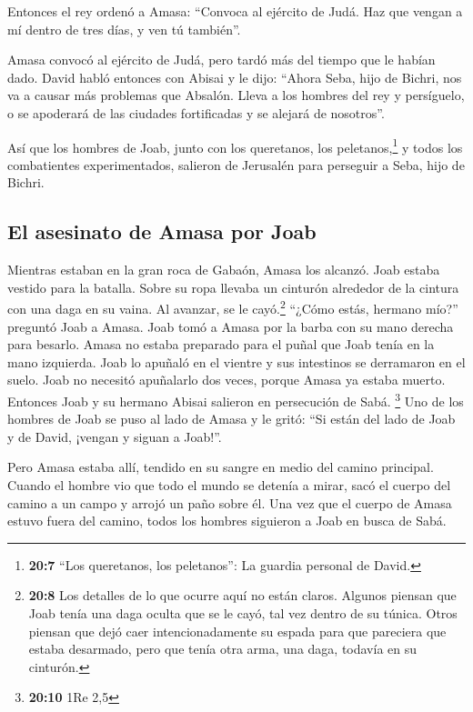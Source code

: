  Entonces el rey ordenó a Amasa: ``Convoca al ejército de
Judá. Haz que vengan a mí dentro de tres días, y ven tú también''.

 Amasa convocó al ejército de Judá, pero tardó más del
tiempo que le habían dado.  David habló entonces con
Abisai y le dijo: ``Ahora Seba, hijo de Bichri, nos va a causar más
problemas que Absalón. Lleva a los hombres del rey y persíguelo, o se
apoderará de las ciudades fortificadas y se alejará de nosotros''.

 Así que los hombres de Joab, junto con los queretanos,
los peletanos,\footnote{\textbf{20:7} ``Los queretanos, los peletanos'':
  La guardia personal de David.} y todos los combatientes
experimentados, salieron de Jerusalén para perseguir a Seba, hijo de
Bichri.

\hypertarget{el-asesinato-de-amasa-por-joab}{%
\subsection{El asesinato de Amasa por
Joab}\label{el-asesinato-de-amasa-por-joab}}

 Mientras estaban en la gran roca de Gabaón, Amasa los
alcanzó. Joab estaba vestido para la batalla. Sobre su ropa llevaba un
cinturón alrededor de la cintura con una daga en su vaina. Al avanzar,
se le cayó.\footnote{\textbf{20:8} Los detalles de lo que ocurre aquí no
  están claros. Algunos piensan que Joab tenía una daga oculta que se le
  cayó, tal vez dentro de su túnica. Otros piensan que dejó caer
  intencionadamente su espada para que pareciera que estaba desarmado,
  pero que tenía otra arma, una daga, todavía en su cinturón.}
 ``¿Cómo estás, hermano mío?'' preguntó Joab a Amasa. Joab
tomó a Amasa por la barba con su mano derecha para besarlo.
 Amasa no estaba preparado para el puñal que Joab tenía
en la mano izquierda. Joab lo apuñaló en el vientre y sus intestinos se
derramaron en el suelo. Joab no necesitó apuñalarlo dos veces, porque
Amasa ya estaba muerto. Entonces Joab y su hermano Abisai salieron en
persecución de Sabá. \footnote{\textbf{20:10} 1Re 2,5} 
Uno de los hombres de Joab se puso al lado de Amasa y le gritó: ``Si
están del lado de Joab y de David, ¡vengan y siguan a Joab!''.

 Pero Amasa estaba allí, tendido en su sangre en medio
del camino principal. Cuando el hombre vio que todo el mundo se detenía
a mirar, sacó el cuerpo del camino a un campo y arrojó un paño sobre él.
 Una vez que el cuerpo de Amasa estuvo fuera del camino,
todos los hombres siguieron a Joab en busca de Sabá.


